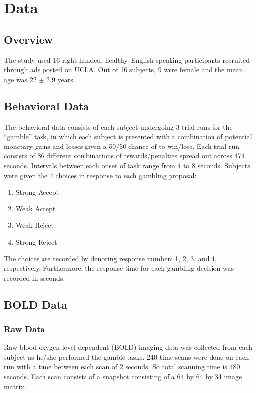\documentclass[11pt]{article}
\begin{document}
\section{Data}
\subsection{Overview}
The study used 16 right-handed, healthy, English-speaking participants 
recruited through ads posted on UCLA. Out of 16 subjects, 9 were female and 
the mean age was 22 $ \pm $ 2.9 years. 

\subsection{Behavioral Data}
The behavioral data consists of each subject undergoing 3 trial runs for the 
``gamble'' task, in which each subject is presented with a combination of 
potential monetary gains and losses given a 50/50 chance of to win/loss. Each 
trial run consists of 86 different combinations of rewards/penalties spread 
out across 474 seconds. Intervals between each onset of task range from 4 to 
8 seconds. Subjects were given the 4 choices in response to each gambling 
proposal:
\begin{enumerate}
  \item Strong Accept
  \item Weak Accept
  \item Weak Reject
  \item Strong Reject
\end{enumerate}
The choices are recorded by denoting response numbers 1, 2, 3, and 4, 
respectively. Furthermore, the response time for each gambling decision was 
recorded in seconds. 
\subsection{BOLD Data}
\subsubsection{Raw Data}
Raw blood-oxygen-level dependent (BOLD) imaging data was collected from each
subject as he/she performed the gamble tasks. 240 time scans were done on each
run with a time between each scan of 2 seconds. So total scanning time is 480
seconds. Each scan consists of a snapshot consisting of a 64 by 64 by 34 image
matrix.
\end{document}

